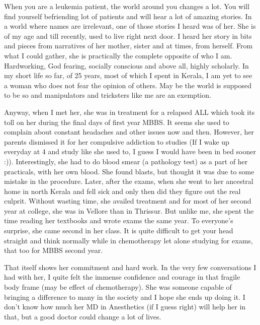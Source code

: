 \vskip 2pt
{\engtext
When you are a leukemia patient, the world around you changes a lot. You will find yourself befriending lot of patients and will hear a lot of amazing stories. In a world where names are irrelevant, one of those stories I heard was of her. She is of my age and till recently, used to live right next door. I heard her story in bits and pieces from narratives of her mother, sister and at times, from herself. From what I could gather, she is practically the complete opposite of who I am. Hardworking, God fearing, socially conscious and above all, highly scholarly. In my short life so far, of 25 years, most of which I spent in Kerala, I am yet to see a woman who does not fear the opinion of others. May be the world is supposed to be so and manipulators and tricksters like me are an exemption.

Anyway, when I met her, she was in treatment for a relapsed ALL which took its toll on her during the final days of first year MBBS. It seems she used to complain about constant headaches and other issues now and then. However, her parents dismissed it for her compulsive addiction to studies (If I wake up everyday at 4 and study like she used to, I guess I would have been in bed sooner :)). Interestingly, she had to do blood smear (a pathology test) as a part of her practicals, with her own blood. She found blasts, but thought it was due to some mistake in the procedure. Later, after the exams, when she went to her ancestral home in north Kerala and fell sick and only then did they figure out the real culprit. Without wasting time, she availed treatment and for most of her second year at college, she was in Vellore than in Thrissur. But unlike me, she spent the time reading her textbooks and wrote exams the same year. To everyone's surprise, she came second in her class. It is quite difficult to get your head straight and think normally while in chemotherapy let alone studying for exams, that too for MBBS second year. 

That itself shows her commitment and hard work. In the very few conversations I had with her, I quite felt the immense confidence and courage in that fragile body frame (may be effect of chemotherapy). She was someone capable of bringing a difference to many in the society and I hope she ends up doing it. I don't know how much her MD in Anesthetics (if I guess right) will help her in that, but a good doctor could change a lot of lives. 

}
